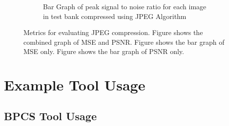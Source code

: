 \documentclass{l4proj}
\begin{document}
\begin{appendices}
\begin{figure}[!h]
\begin{subfigure}[b]{0.55\textwidth}
        \caption{Bar Graph of peak signal to noise ratio for each image in test bank compressed using JPEG Algorithm}
        \label{fig:compress_psnr}
    \end{subfigure}
    \caption{Metrics for evaluating JPEG compression. Figure  shows the combined graph of MSE and PSNR. Figure  shows the bar graph of MSE only. Figure  shows the bar graph of PSNR only.}
    \label{compression_metrics_graphs}
\end{figure}


\chapter{Example Tool Usage}

\section{BPCS Tool Usage}


\end{appendices}
\end{document}
